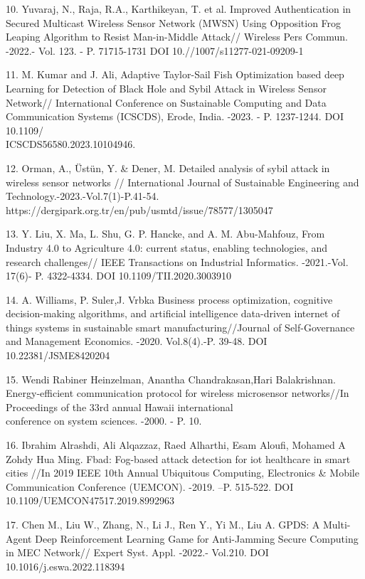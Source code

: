\begin{noparindent}
10. Yuvaraj, N., Raja, R.A., Karthikeyan, T. et al. Improved
Authentication in Secured Multicast Wireless Sensor Network (MWSN) Using
Opposition Frog Leaping Algorithm to Resist Man-in-Middle Attack//
Wireless Pers Commun. -2022.- Vol. 123. - P. 71715-1731
DOI 10.//1007/s11277-021-09209-1

11. M. Kumar and J. Ali, Adaptive Taylor-Sail Fish Optimization based
deep Learning for Detection of Black Hole and Sybil Attack in Wireless
Sensor Network// International Conference on Sustainable Computing and
Data Communication Systems (ICSCDS), Erode, India. -2023. - P.
1237-1244. DOI 10.1109/\\ICSCDS56580.2023.10104946.

12. Orman, A., Üstün, Y. \& Dener, M. Detailed analysis of sybil attack
in wireless sensor networks // International Journal of Sustainable
Engineering and Technology.-2023.-Vol.7(1)-P.41-54.
\\https://dergipark.org.tr/en/pub/usmtd/issue/78577/1305047

13. Y. Liu, X. Ma, L. Shu, G. P. Hancke, and A. M. Abu-Mahfouz, From
Industry 4.0 to Agriculture 4.0: current status, enabling technologies,
and research challenges// IEEE Transactions on Industrial Informatics.
-2021.-Vol. 17(6)- P. 4322-4334. DOI 10.1109/TII.2020.3003910

14. A. Williams, P. Suler,J. Vrbka Business process optimization,
cognitive decision-making algorithms, and artificial intelligence
data-driven internet of things systems in sustainable smart
manufacturing//Journal of Self-Governance and Management Economics.
-2020. Vol.8(4).-P. 39-48. DOI 10.22381/JSME8420204

15. Wendi Rabiner Heinzelman, Anantha Chandrakasan,Hari Balakrishnan.
Energy-efficient communication protocol for wireless microsensor
networks//In Proceedings of the 33rd annual Hawaii international
\\conference on system sciences. -2000. - P. 10.

16. Ibrahim Alrashdi, Ali Alqazzaz, Raed Alharthi, Esam Aloufi, Mohamed
A Zohdy Hua Ming. Fbad: Fog-based attack detection for iot healthcare in
smart cities //In 2019 IEEE 10th Annual Ubiquitous Computing,
Electronics \& Mobile Communication Conference (UEMCON). -2019. --P.
515-522. DOI 10.1109/UEMCON47517.2019.8992963

17. Chen M., Liu W., Zhang, N., Li J., Ren Y., Yi M., Liu A. GPDS: A
Multi-Agent Deep Reinforcement Learning Game for Anti-Jamming Secure
Computing in MEC Network// Expert Syst. Appl. -2022.- Vol.210. DOI
10.1016/j.eswa.2022.118394


\end{noparindent}
